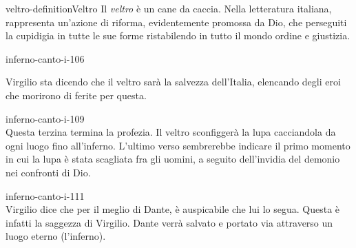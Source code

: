 \documentclass[preview]{standalone}
\begin{document}
\begin{snippetdefinition}{veltro-definition}{Veltro}
    Il \textit{veltro} è un cane da caccia.
    Nella letteratura italiana, rappresenta un'azione di riforma,
    evidentemente promossa da Dio, che perseguiti la cupidigia in tutte le sue forme
    ristabilendo in tutto il mondo ordine e giustizia. 
\end{snippetdefinition}

\begin{snippet}{inferno-canto-i-106}

    Virgilio sta dicendo che il veltro sarà la salvezza dell'Italia, elencando degli eroi che morirono di ferite per questa.
\end{snippet}

\begin{snippet}{inferno-canto-i-109}
    \\
    Questa terzina termina la profezia.
    Il veltro sconfiggerà la lupa cacciandola da ogni luogo fino all'inferno.
    L'ultimo verso sembrerebbe indicare il primo momento in cui la lupa è stata scagliata
    fra gli uomini, a seguito dell'invidia del demonio nei confronti di Dio.
\end{snippet}

\begin{snippet}{inferno-canto-i-111}
    \\
    Virgilio dice che per il meglio di Dante, è auspicabile che lui lo segua.
    Questa è infatti la saggezza di Virgilio.
    Dante verrà salvato e portato via attraverso un luogo eterno (l'inferno).
\end{snippet}
\end{document}
